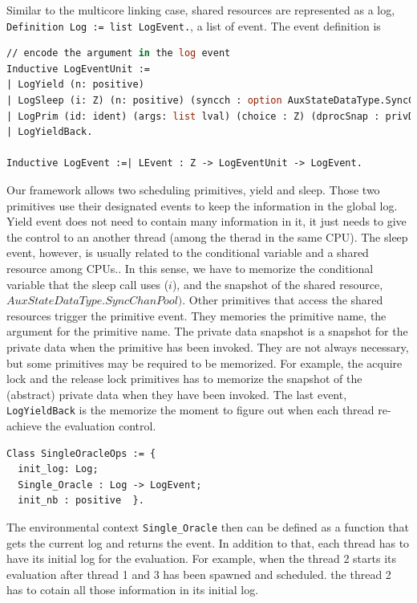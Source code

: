 Similar to the multicore linking case, 
shared resources are represented as a log, \lstinline$Definition Log := list LogEvent.$,  a list of event.
The event definition is 
\begin{lstlisting}[language=Caml]
// encode the argument in the log event
Inductive LogEventUnit :=
| LogYield (n: positive)
| LogSleep (i: Z) (n: positive) (syncch : option AuxStateDataType.SyncChanPool)
| LogPrim (id: ident) (args: list lval) (choice : Z) (dprocSnap : privDataSnap) 
| LogYieldBack.

Inductive LogEvent :=| LEvent : Z -> LogEventUnit -> LogEvent.
\end{lstlisting}
Our framework allows 
two scheduling primitives, 
yield and sleep. 
Those two primitives use their designated events to keep the information in the global log. 
Yield event does not need to contain many information in it, it just needs to give the control
to an another thread (among the therad in the same CPU). 
The sleep event, however, is usually related to the conditional variable and a shared resource among CPUs..
In this sense, we have to memorize the conditional variable that the sleep call uses ($i$),
and the snapshot of the shared resource, $AuxStateDataType.SyncChanPool)$.  
Other primitives that access the shared resources trigger the primitive event. 
They memories the primitive name, the argument for the primitive name. 
The private data snapshot is a snapshot for the private data when the primitive has been invoked. 
They are not always necessary, but some primitives may be required to be memorized. 
For example, the acquire lock and the release lock primitives 
has to memorize the snapshot of the (abstract) private data when they have been invoked. 
The last event, \lstinline$LogYieldBack$ is the memorize the 
moment to figure out when each thread re-achieve the evaluation control. 

\begin{lstlisting}[language=Caml]
Class SingleOracleOps := {
  init_log: Log;
  Single_Oracle : Log -> LogEvent;
  init_nb : positive  }.
\end{lstlisting}
The environmental context \lstinline$Single_Oracle$ 
then can be defined as a function that gets the current log and returns the event. 
In addition to that, 
each thread has to have its initial log 
for the evaluation. 
For example,
when the thread 2 starts its evaluation after 
thread 1 and 3 has been spawned and scheduled. 
the thread 2 has to cotain all those information in its initial log.


